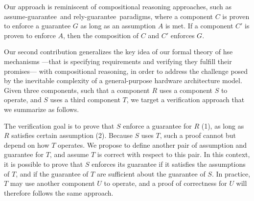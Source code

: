 Our approach is reminiscent of compositional reasoning approaches, such as
assume-guarantee\,\cite{pnueli1985ag} and
rely-guarantee\,\cite{jones1983tentative} paradigms, where a component \( C \)
is proven to enforce a guarantee \( G \) as long as an assumption \( A \) is
met. 
%
If a component \( C' \) is proven to enforce \( A \), then the composition of
\( C \) and \( C' \) enforces \( G \).

Our second contribution generalizes the key idea of our formal theory of
\ac{hse} mechanisms ---that is specifying requirements and verifying they
fulfill their promises--- with compositional reasoning, in order to address the
challenge posed by the inevitable complexity of a general-purpose hardware
architecture model.
%
Given three components, such that a component \( R \) uses a
component \( S \) to operate, and \( S \) uses a third component \( T \), we
target a verification approach that we summarize as follows.

\begin{center}
\end{center}

The verification goal is to prove that \( S \) enforce a guarantee for \( R \)
(1), as long as \( R \) satisfies certain assumption (2).
%
Because \( S \) uses \( T \), such a proof cannot but depend  on how \( T \) operates.
%
We propose to define another pair of assumption and guarantee for \( T \), and
assume \( T \) is correct with respect to this pair.
%
In this context, it is possible to prove that \( S \) enforces its guarantee if
it satisfies the assumptions of \( T \), and if the guarantee of \( T \) are
sufficient about the guarantee of \( S \).
%
In practice, \( T \) may use another component \( U \) to operate, and a proof
of correctness for \( U \) will therefore follows the same approach.

